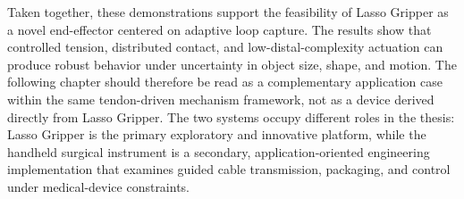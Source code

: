 Taken together, these demonstrations support the feasibility of Lasso Gripper as a novel end-effector centered on adaptive loop capture. The results show that controlled tension, distributed contact, and low-distal-complexity actuation can produce robust behavior under uncertainty in object size, shape, and motion. The following chapter should therefore be read as a complementary application case within the same tendon-driven mechanism framework, not as a device derived directly from Lasso Gripper. The two systems occupy different roles in the thesis: Lasso Gripper is the primary exploratory and innovative platform, while the handheld surgical instrument is a secondary, application-oriented engineering implementation that examines guided cable transmission, packaging, and control under medical-device constraints.
